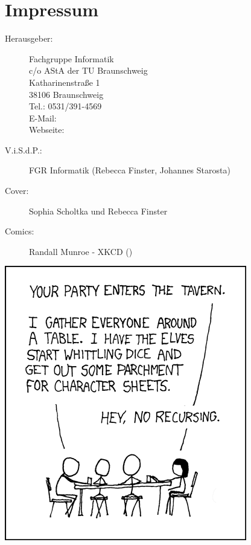 \section{Impressum}
\label{impressum}
\begin{description}
\item[Herausgeber:]
	Fachgruppe Informatik\\
	c/o AStA der TU Braunschweig\\
	Katharinenstraße 1\\
	38106 Braunschweig\\
	Tel.: 0531/391-4569\\
	E-Mail: \\
	Webseite: \fginfoUrl
\item[V.i.S.d.P.:]  %
  FGR Informatik (Rebecca Finster, Johannes Starosta) 
\item[Cover:] Sophia Scholtka und Rebecca Finster
\item[Comics:] Randall Munroe - XKCD ()
\end{description}
\begin{center}
		\includegraphics[totalheight=10cm]{bilder/XKCD/tabletop_roleplaying}
\end{center}